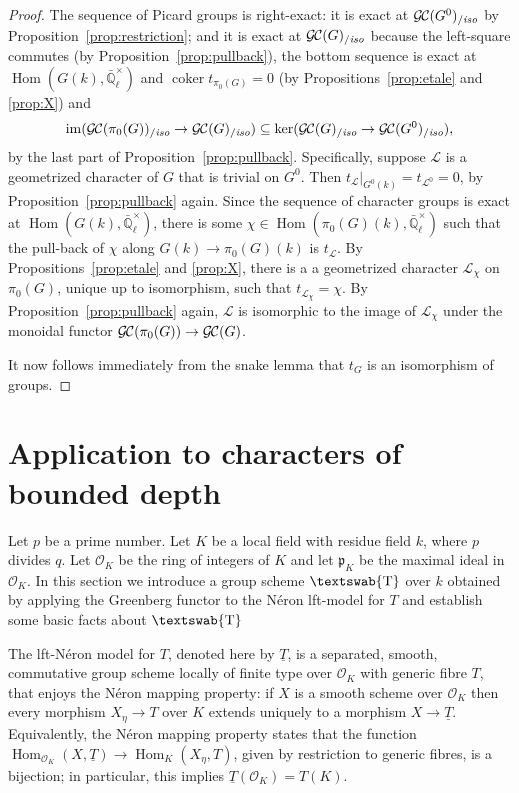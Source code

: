 \documentclass[11pt]{amsart}
\newcommand{\mathswab}[1]{\operatorname{\textswab{#1}}}
\theoremstyle{plain}
\theoremstyle{definition}
\theoremstyle{remark}
\newcommand{\EE}{\mathbb{\bar Q}_\ell}
\newcommand{\OK}{\mathcal{O}_K}
\newcommand{\pK}{\mathfrak{p}_K}
\newcommand{\Fq}{k}
\newcommand{\EEx}{\EE^\times}
\DeclareMathOperator{\Hom}{Hom}
\DeclareMathOperator{\coker}{coker}
\newcommand{\GN}[1]{\mathswab{#1}}
\newcommand{\TT}{\underline{T}}
\newcommand{\cs}[1]{{\mathcal{#1}}}
\newcommand{\GC}{{\mathcal{G\hskip-0.8pt C}}}
\newcommand{\GCiso}[1]{\GC(#1)_{/\textit{iso}}}
\newcommand{\image}{{\operatorname{im}}}
\newcommand{\trFrob}[1]{t_{#1}}
\begin{document}
\begin{proof}
  The sequence of Picard groups is right-exact: it is exact at
  $\GCiso{G^0}$ by Proposition~\ref{prop:restriction}; and
  it is exact at $\GCiso{G}$ because the left-square
  commutes (by Proposition~\ref{prop:pullback}), the bottom sequence
  is exact at $\Hom(G(\Fq),\EEx)$ and $\coker t_{\pi_0(G)} =0$
  (by Propositions~\ref{prop:etale} and \ref{prop:X}) and
  \[
  \image(\GCiso{\pi_0(G)} \to \GCiso{G}) \subseteq \ker(\GCiso{G} \to \GCiso{G^0}),
  \]
  by the last part of Proposition~\ref{prop:pullback}. Specifically,
  suppose $\cs{L}$ is a geometrized character of $G$ that is trivial on
  $G^0$. Then $\trFrob{\cs{L}}\vert_{G^0(\Fq)} = \trFrob{\cs{L}^0} =0$,
  by Proposition~\ref{prop:pullback} again. Since the sequence of
  character groups is exact at $\Hom(G(\Fq),\EEx)$, there is
  some $\chi \in \Hom(\pi_0(G)(\Fq),\EEx)$ such that the
  pull-back of $\chi$ along $G(\Fq)\to \pi_0(G)(\Fq)$ is
  $\trFrob{\cs{L}}$. By Propositions~\ref{prop:etale} and \ref{prop:X},
  there is a a geometrized character $\cs{L}_\chi$ on $\pi_0(G)$, unique up
  to isomorphism, such that $\trFrob{\cs{L}_\chi} = \chi$. By
  Proposition~\ref{prop:pullback} again, $\cs{L}$ is isomorphic to the
  image of $\cs{L}_\chi$ under the monoidal functor $\GC(\pi_0(G)) \to \GC(G)$.

  It now follows immediately from the snake lemma that $\trFrob{G}$ is an
  isomorphism of groups.
\end{proof}

\section{Application to characters of bounded depth}

%
Let $p$ be a prime number. Let $K$ be a local field with residue field
$\Fq$, where $p$ divides $q$. Let $\OK$ be the ring of integers of $K$
and let $\pK$ be the maximal ideal in $\OK$.
%
In this section we introduce a group scheme $\GN{T}$ over $\Fq$
obtained by applying the Greenberg functor to the N\'eron lft-model
for $T$ and establish some basic facts about $\GN{T}$


The lft-N\'eron model for $T$, denoted here by $\TT$, is a separated,
smooth, commutative group scheme locally of finite type over $\OK$
with generic fibre $T$, that enjoys the N\'eron mapping property: if
$X$ is a smooth scheme over $\OK$ then every morphism $X_\eta \to T$
over $K$ extends uniquely to a morphism $X \to \TT$. Equivalently, the
N\'eron mapping property states that the function
$\Hom_{\OK} (X,\TT) \to \Hom_K(X_\eta,T)$, given by restriction to
generic fibres, is a bijection; in particular, this implies $\TT(\OK) = T(K)$.
\end{document}
